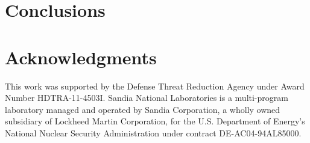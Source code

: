 \documentclass[preprint,12pt, a4paper]{elsarticle}
\begin{document}
\section{Conclusions} \label{s:conclusions}



\section*{Acknowledgments}
This work was supported by the Defense Threat Reduction Agency under Award
Number HDTRA-11-4503I.  Sandia National Laboratories is a multi-program
laboratory managed and operated by Sandia Corporation, a wholly owned
subsidiary of Lockheed Martin Corporation, for the U.S. Department of Energy's
National Nuclear Security Administration under contract DE-AC04-94AL85000.





\end{document}

